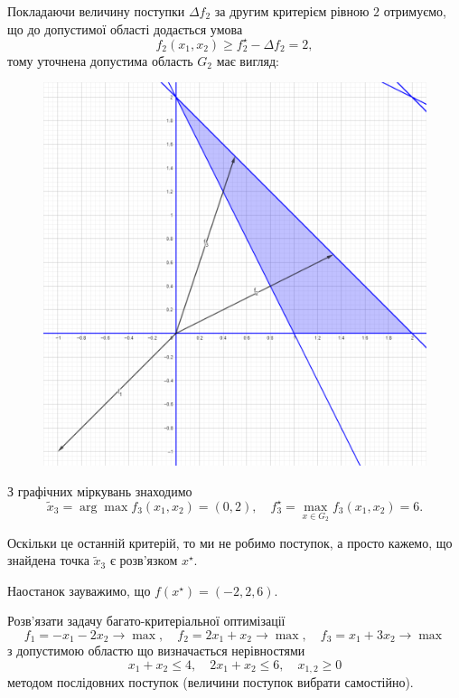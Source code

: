 \begin{solution}
    Покладаючи величину поступки $\Delta f_2$ за другим критерієм рівною $2$ отримуємо, що до допустимої області додається умова \[ f_2(x_1, x_2) \ge f_2^\star - \Delta f_2 = 2, \] тому уточнена допустима область $G_2$ має вигляд:
    \begin{figure}[H]
        \centering
        \includegraphics[width=\textwidth]{successive_concessions_1_3.png}
    \end{figure}

    З графічних міркувань знаходимо \[ \tilde x_3 = \arg \max f_3(x_1, x_2) = (0, 2), \quad f_3^\star = \max_{x \in G_2} f_3(x_1, x_2) = 6. \]
    
    Оскільки це останній критерій, то ми не робимо поступок, а просто кажемо, що знайдена точка $\tilde x_3$ є розв'язком $x^\star$. \medskip
    
    Наостанок зауважимо, що $f(x^\star) = (-2, 2, 6)$.
\end{solution}

\newpage

\begin{problem}
    Розв'язати задачу багато-критеріальної оптимізації \[ f_1 = - x_1 - 2 x_2 \to \max, \quad f_2 = 2 x_1 + x_2 \to \max, \quad f_3 = x_1 + 3 x_2 \to \max \] з допустимою областю що визначається нерівностями \[ x_1 + x_2 \le 4, \quad 2 x_1 + x_2 \le 6, \quad x_{1, 2} \ge 0 \] методом послідовних поступок (величини поступок вибрати самостійно).
\end{problem}

